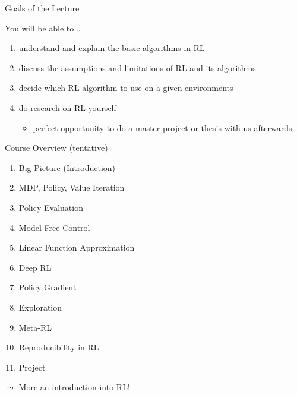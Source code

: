 \documentclass[aspectratio=169]{./latex_main/tntbeamer}  %
\begin{document}
\begin{frame}[c]{Goals of the Lecture}
	
	You will be able to \ldots
	\begin{enumerate}
		\item understand and explain the basic algorithms in RL
		\smallskip
		\item discuss the assumptions and limitations of RL and its algorithms
		\smallskip
		\item decide which RL algorithm to use on a given environments
		\smallskip
		\item do research on RL yourself
		\begin{itemize}
			\item perfect opportunity to do a master project or thesis with us afterwards
		\end{itemize}
	\end{enumerate}
	
\end{frame}
\begin{frame}[c]{Course Overview (tentative)}
	
	\begin{enumerate}
		\item Big Picture (Introduction)
		\item MDP, Policy, Value Iteration
		\item Policy Evaluation
		\item Model Free Control
		\item Linear Function Approximation
		\item Deep RL
		\item Policy Gradient
		\item Exploration
		\item Meta-RL
		\item Reproducibility in RL
		\item Project
	\end{enumerate}
	
	\pause
	$\leadsto$ More an introduction into RL!
	
\end{frame}
\end{document}
